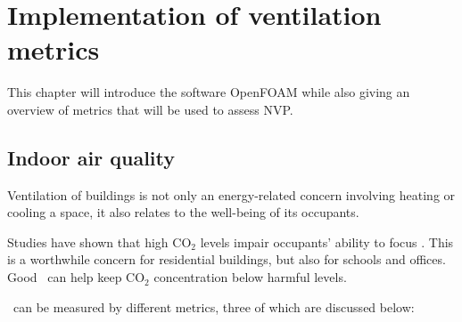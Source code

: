 
\chapter{Implementation of ventilation metrics}
\label{chap:OF_custom_features}

This chapter will introduce the software \gls{OpenFOAM} while also giving an overview of metrics that will be used to assess \gls{NVP}.




\section{Indoor air quality}


Ventilation of buildings is not only an energy-related concern involving heating or cooling a space, it also relates to the well-being of its occupants.

Studies have shown that high CO$_2$ levels impair occupants' ability to focus \citep{Heath2002,Kosonen2004}. This is a worthwhile concern for residential buildings, but also for schools and offices. Good \NVP\ can help keep CO$_2$ concentration below harmful levels.
 


\NVP\ can be measured by different metrics, three of which are discussed below:

